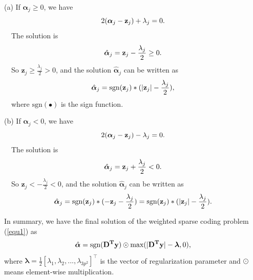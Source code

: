 \documentclass[10pt,onecolumn,letterpaper]{article}
\begin{document}
(a) If $\bm{\alpha}_{j}\ge 0$, we have
\vspace{-1mm}
\begin{equation}\label{equ5}\vspace{-1mm}
2(\bm{\alpha}_{j}-\mathbf{z}_{j})+\lambda_{j}=0.
\end{equation}
\qquad\ \  The solution is
\vspace{-1mm}
\begin{equation}\label{equ6}\vspace{-1mm}
\hat{\bm{\alpha}}_{j}=\mathbf{z}_{j}-\frac{\lambda_{j}}{2} \ge 0.
\end{equation}
\qquad\ \  So $\mathbf{z}_{j}\ge\frac{\lambda_{j}}{2}> 0$, and the solution $\hat{\bm{\alpha}}_{j}$ can be written as
\vspace{-2mm}
\begin{equation}\label{equ7}\vspace{-2mm}
\hat{\bm{\alpha}}_{j}=\text{sgn}(\mathbf{z}_{j})*(|\mathbf{z}_{j}|-\frac{\lambda_{j}}{2}),
\end{equation}
\qquad\ \  where $\text{sgn}(\bullet)$ is the sign function. 

(b) If $\bm{\alpha}_{j}< 0$, we have
\vspace{-1mm}
\begin{equation}\label{equ8}\vspace{-1mm}
2(\bm{\alpha}_{j}-\mathbf{z}_{j})-\lambda_{j}=0.
\end{equation}
\qquad\ \  The solution is
\vspace{-2mm}
\begin{equation}\label{equ9}\vspace{-2mm}
\hat{\bm{\alpha}}_{j}=\mathbf{z}_{j}+\frac{\lambda_{j}}{2} < 0.
\end{equation}
\qquad\ \  So $\mathbf{z}_{j}<-\frac{\lambda_{j}}{2}< 0$, and the solution $\hat{\bm{\alpha}}_{j}$ can be written as
\vspace{-1mm}
\begin{equation}\label{equ10}\vspace{-1mm}
\hat{\bm{\alpha}}_{j}=\text{sgn}(\mathbf{z}_{j})*(-\mathbf{z}_{j}-\frac{\lambda_{j}}{2})=\text{sgn}(\mathbf{z}_{j})*(|\mathbf{z}_{j}|-\frac{\lambda_{j}}{2}).
\end{equation} 

In summary, we have the final solution of the weighted sparse coding problem (\ref{equ1}) as
\vspace{-1mm}
\begin{equation}\label{equ11}\vspace{-1mm}
\hat{\bm{\alpha}}= \text{sgn}(\mathbf{D^{T}y})\odot \text{max}(|\mathbf{D^{T}y}|-\bm{\lambda},0),
\end{equation}
where $\bm{\lambda} = \frac{1}{2}[\lambda_{1},\lambda_{2},...,\lambda_{3p^2}]^{\top}$ is the vector of regularization parameter and $\odot$ means element-wise multiplication.
\end{document}
